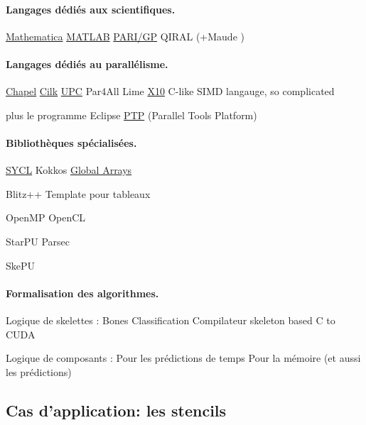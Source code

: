 \paragraph{Langages dédiés aux scientifiques.}

\textsf{\href{http://www.wolfram.com/mathematica/}{Mathematica}}
\textsf{\href{http://fr.mathworks.com/}{MATLAB}}
\textsf{\href{http://pari.math.u-bordeaux.fr/}{PARI/GP}}
\textsf{QIRAL} \cite{Art13,Art14} (+\textsf{Maude} \cite{Art12})



\paragraph{Langages dédiés au parallélisme.}
\textsf{\href{http://chapel.cray.com/}{Chapel}}
\textsf{\href{https://www.cilkplus.org/}{Cilk}}
\textsf{\href{http://upc.lbl.gov/}{UPC}}
\textsf{Par4All} \cite{Ths2}
\textsf{Lime} \cite{Art8}
\textsf{\href{http://x10-lang.org/}{X10}}
C-like SIMD langauge, so complicated \cite{Art10}

plus le programme \textsf{Eclipse \href{http://www.eclipse.org/ptp/}{PTP}} (Parallel Tools Platform) \cite{Art23,Art25}

\paragraph{Bibliothèques spécialisées.}

\textsf{\href{https://www.khronos.org/sycl}{SYCL}} 
\textsf{Kokkos} \cite{Web5}
\textsf{\href{http://hpc.pnl.gov/globalarrays/}{Global Arrays}}

\textsf{Blitz++} \cite{Art5}
Template pour tableaux \cite{Art2}

\textsf{OpenMP}
\textsf{OpenCL}

\textsf{StarPU}
\textsf{Parsec}

\textsf{SkePU} \cite{MstThs1}


\paragraph{Formalisation des algorithmes.}

Logique de skelettes : 
\textsf{Bones}
Classification \cite{Art4}
Compilateur skeleton based C to CUDA \cite{Art3,Art9}

Logique de composants : 
Pour les prédictions de temps \cite{Art7}
Pour la mémoire (et aussi les prédictions) \cite[p.~78]{Ths1} 

\subsection{Cas d'application: les stencils}

